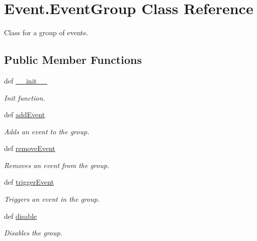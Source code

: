 \hypertarget{class_event_1_1_event_group}{
\section{Event.EventGroup Class Reference}
\label{class_event_1_1_event_group}
}


Class for a group of events.  


\subsection*{Public Member Functions}
\begin{DoxyCompactItemize}
\item 
def \hyperlink{class_event_1_1_event_group_ad1ebaceb20cb6149a8b5249b94307709}{\_\-\_\-init\_\-\_\-}
\begin{DoxyCompactList}\small\item\em Init function. \item\end{DoxyCompactList}\item 
def \hyperlink{class_event_1_1_event_group_ae64ca96cf4d8532a252facaf58821ba9}{addEvent}
\begin{DoxyCompactList}\small\item\em Adds an event to the group. \item\end{DoxyCompactList}\item 
def \hyperlink{class_event_1_1_event_group_aaeb41463c369afbac4cba57f2abbeede}{removeEvent}
\begin{DoxyCompactList}\small\item\em Removes an event from the group. \item\end{DoxyCompactList}\item 
def \hyperlink{class_event_1_1_event_group_a8a56df89cd9ee525d57d161e151a892d}{triggerEvent}
\begin{DoxyCompactList}\small\item\em Triggers an event in the group. \item\end{DoxyCompactList}\item 
def \hyperlink{class_event_1_1_event_group_ab2d2732bccc85ccc6da3ce381d14f314}{disable}
\begin{DoxyCompactList}\small\item\em Disables the group. \item\end{DoxyCompactList}\item 

\end{DoxyCompactItemize}
